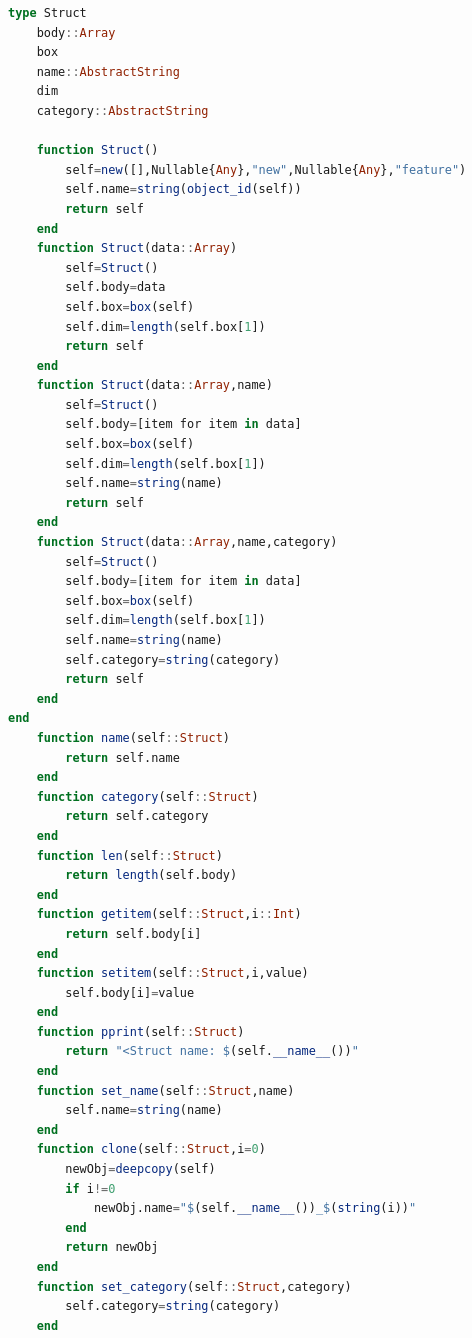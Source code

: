 \documentclass[a4paper,12pt]{article}
\begin{document}
\begin{lstlisting}[language=Julia]
type Struct
	body::Array
	box
	name::AbstractString
	dim
	category::AbstractString
	
	function Struct()
		self=new([],Nullable{Any},"new",Nullable{Any},"feature")
		self.name=string(object_id(self))
		return self
	end
	function Struct(data::Array)
		self=Struct()
		self.body=data
		self.box=box(self)
		self.dim=length(self.box[1])
		return self
	end	
	function Struct(data::Array,name)
		self=Struct()
		self.body=[item for item in data]
		self.box=box(self)
		self.dim=length(self.box[1])
		self.name=string(name)
		return self
	end
	function Struct(data::Array,name,category)
		self=Struct()
		self.body=[item for item in data]
		self.box=box(self)
		self.dim=length(self.box[1])
		self.name=string(name)
		self.category=string(category)
		return self
	end
end
	function name(self::Struct)
		return self.name
	end
	function category(self::Struct)
		return self.category
	end
	function len(self::Struct)
		return length(self.body)
	end
	function getitem(self::Struct,i::Int)
		return self.body[i]
	end
	function setitem(self::Struct,i,value)
		self.body[i]=value
	end
	function pprint(self::Struct)
		return "<Struct name: $(self.__name__())"
	end
	function set_name(self::Struct,name)
		self.name=string(name)
	end
	function clone(self::Struct,i=0)
		newObj=deepcopy(self)
		if i!=0
			newObj.name="$(self.__name__())_$(string(i))"
		end
		return newObj
	end
	function set_category(self::Struct,category)
		self.category=string(category)
	end
\end{lstlisting}
\end{document}
